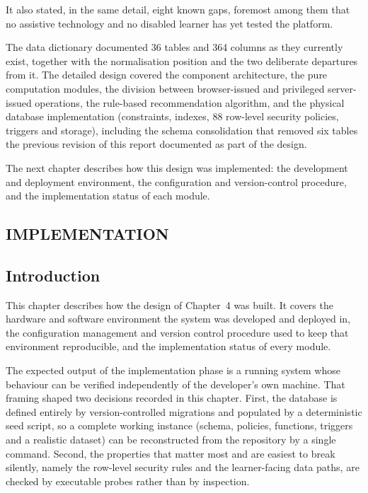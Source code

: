 \documentclass[12pt, oneside]{article} %
\begin{document}
It also stated, in the same detail, eight known gaps, foremost among them that no assistive technology and no disabled learner has yet tested the platform.

The data dictionary documented 36 tables and 364 columns as they currently exist, together with the normalisation position and the two deliberate departures from it. The detailed design covered the component architecture, the pure computation modules, the division between browser-issued and privileged server-issued operations, the rule-based recommendation algorithm, and the physical database implementation (constraints, indexes, 88 row-level security policies, triggers and storage), including the schema consolidation that removed six tables the previous revision of this report documented as part of the design.

The next chapter describes how this design was implemented: the development and deployment environment, the configuration and version-control procedure, and the implementation status of each module.


\newpage
\vfill \null
\thispagestyle{empty}
\begin{center}
\section{IMPLEMENTATION}
\end{center}
\vspace{2cm}

\subsection{Introduction}

This chapter describes how the design of Chapter~4 was built. It covers the hardware and software environment the system was developed and deployed in, the configuration management and version control procedure used to keep that environment reproducible, and the implementation status of every module.

The expected output of the implementation phase is a running system whose behaviour can be verified independently of the developer's own machine. That framing shaped two decisions recorded in this chapter. First, the database is defined entirely by version-controlled migrations and populated by a deterministic seed script, so a complete working instance (schema, policies, functions, triggers and a realistic dataset) can be reconstructed from the repository by a single command. Second, the properties that matter most and are easiest to break silently, namely the row-level security rules and the learner-facing data paths, are checked by executable probes rather than by inspection.
\end{document}
